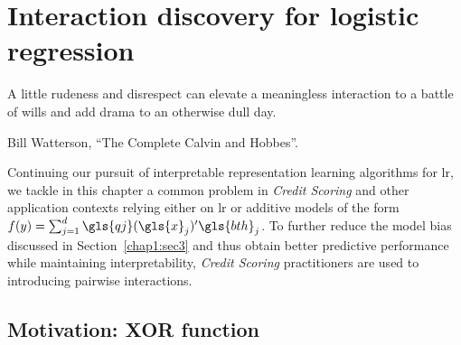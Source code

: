 \chapter{Interaction discovery for logistic regression} \label{chap5}


\epigraph{A little rudeness and disrespect can elevate a meaningless interaction to a battle of wills and add drama to an otherwise dull day.}{Bill Watterson, ``The Complete Calvin and Hobbes''.}

\minitoc


\bigskip

Continuing our pursuit of interpretable representation learning algorithms for \gls{lr}, we tackle in this chapter a common problem in \textit{Credit Scoring} and other application contexts relying either on \gls{lr} or additive models of the form $f(y) = \sum_{j=1}^d \gls{qj}(\gls{x}_j)' \gls{bth}_j$. To further reduce the model bias discussed in Section~\ref{chap1:sec3} and thus obtain better predictive performance while maintaining interpretability, \textit{Credit Scoring} practitioners are used to introducing pairwise interactions.


\section{Motivation: XOR function}

